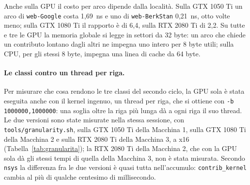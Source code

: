 \documentclass[11pt,a4paper]{article}
\newcommand{\stacco}{\par\medskip\noindent}
\begin{document}
\stacco
Anche sulla GPU il costo per arco dipende dalla località. Sulla GTX
1050 Ti un arco di \texttt{web-Google} costa 1,69~ns e uno di
\texttt{web-BerkStan} 0,21~ns, otto volte meno; sulla GTX 1080 Ti il rapporto è
di 6,4, sulla RTX 2080 Ti di 2,2. Su tutte e tre le GPU la memoria globale si
legge in settori da 32 byte: un arco che chiede un contributo lontano dagli altri ne impegna uno
intero per 8 byte utili; sulla CPU, per gli stessi 8 byte, impegna una linea
di cache da 64 byte.

\paragraph{Le classi contro un thread per riga.}
Per misurare che cosa rendono le tre classi del secondo ciclo, 
la GPU sola è stata eseguita anche con il kernel
ingenuo, un thread per riga, che si ottiene con \texttt{-b 1000000,1000000}:
una soglia oltre la riga più lunga dà a ogni riga il suo thread. Le due
versioni sono state misurate nella stessa sessione, con
\texttt{tools/granularity.sh}, sulla GTX 1050 Ti della Macchina 1, sulla GTX
1080 Ti della Macchina 2 e sulla RTX 2080 Ti della Macchina 3, a x16
(Tabella~\ref{tab:granularita}); la RTX 2080 Ti della Macchina 2, che con la
GPU sola dà gli stessi tempi di quella della Macchina 3, non è stata misurata.
Secondo \texttt{nsys} la differenza fra le due versioni è quasi tutta
nell'accumulo: \texttt{contrib\_kernel} cambia al più di qualche centesimo di
millisecondo.
\end{document}
